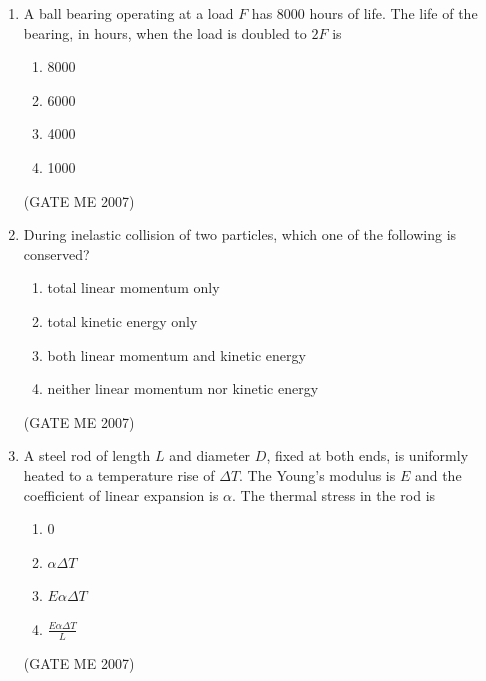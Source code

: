 \documentclass[journal]{IEEEtran}
\begin{document}
\begin{enumerate}
\begin{multicols}{4}
\begin{enumerate}
\item 25
\item 30
\item 35
\item 60
\end{enumerate}
\end{multicols}
\hfill (GATE ME 2007)

\item A ball bearing operating at a load $ F $ has 8000 hours of life. The life of the bearing, in hours, when the load is doubled to $ 2F $ is
\begin{multicols}{4}
\begin{enumerate}
\item 8000
\item 6000
\item 4000
\item 1000
\end{enumerate}
\end{multicols}
\hfill (GATE ME 2007)

\item During inelastic collision of two particles, which one of the following is conserved?
\begin{enumerate}
\item total linear momentum only
\item total kinetic energy only
\item both linear momentum and kinetic energy
\item neither linear momentum nor kinetic energy
\end{enumerate}
\hfill (GATE ME 2007)

\item A steel rod of length $ L $ and diameter $ D $, fixed at both ends, is uniformly heated to a temperature rise of $ \Delta T $. The Young's modulus is $ E $ and the coefficient of linear expansion is $ \alpha $. The thermal stress in the rod is
\begin{multicols}{4}
\begin{enumerate}
\item 0
\item $ \alpha \Delta T $
\item $ E \alpha \Delta T $
\item $ \frac{E \alpha \Delta T}{L} $
\end{enumerate}
\end{multicols}
\hfill (GATE ME 2007)


\end{enumerate}
\end{document}
